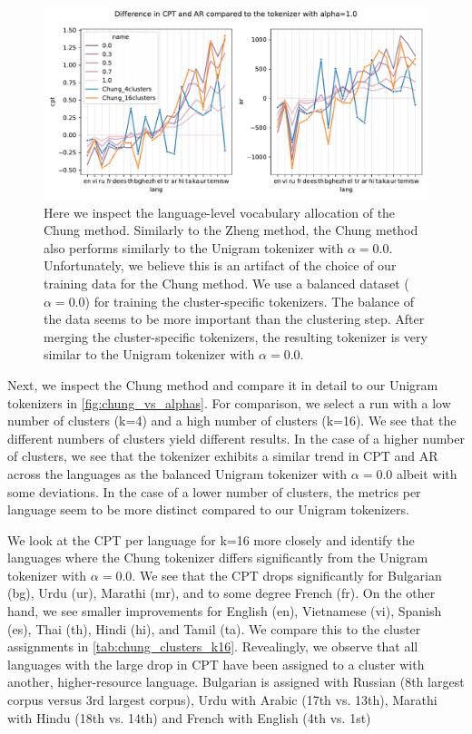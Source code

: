 \begin{figure}[H]
    \centering
    \includegraphics[width=\textwidth]{figures/chung_vs_alphas.pdf}
    \caption{Here we inspect the language-level vocabulary allocation of the Chung method. Similarly to the Zheng method, the Chung method also performs similarly to the Unigram tokenizer with $\alpha=0.0$. Unfortunately, we believe this is an artifact of the choice of our training data for the Chung method. We use a balanced dataset ($\alpha=0.0$) for training the cluster-specific tokenizers. The balance of the data seems to be more important than the clustering step. After merging the cluster-specific tokenizers, the resulting tokenizer is very similar to the Unigram tokenizer with $\alpha=0.0$.}
    \label{fig:chung_vs_alphas}
\end{figure}

Next, we inspect the Chung method and compare it in detail to our Unigram tokenizers in \autoref{fig:chung_vs_alphas}. For comparison, we select a run with a low number of clusters (k=4) and a high number of clusters (k=16). We see that the different numbers of clusters yield different results. In the case of a higher number of clusters, we see that the tokenizer exhibits a similar trend in CPT and AR across the languages as the balanced Unigram tokenizer with $\alpha=0.0$ albeit with some deviations. In the case of a lower number of clusters, the metrics per language seem to be more distinct compared to our Unigram tokenizers. 




We look at the CPT per language for k=16 more closely and identify the languages where the Chung tokenizer differs significantly from the Unigram tokenizer with $\alpha=0.0$. We see that the CPT drops significantly for Bulgarian (bg), Urdu (ur), Marathi (mr), and to some degree French (fr). On the other hand, we see smaller improvements for English (en), Vietnamese (vi), Spanish (es), Thai (th), Hindi (hi), and Tamil (ta). We compare this to the cluster assignments in \autoref{tab:chung_clusters_k16}. Revealingly, we observe that all languages with the large drop in CPT have been assigned to a cluster with another, higher-resource language. Bulgarian is assigned with Russian (8th largest corpus versus 3rd largest corpus), Urdu with Arabic (17th vs. 13th), Marathi with Hindu (18th vs. 14th) and French with English (4th vs. 1st)

